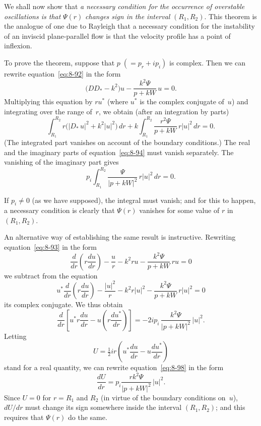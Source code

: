 We shall now show that \emph{a necessary condition for the occurrence of overstable oscillations is that} $\Psi(r)$ \emph{changes sign in the interval} $(R_1, R_2)$. This theorem is the analogue of one due to Rayleigh that a necessary condition for the instability of an inviscid plane-parallel flow is that the velocity profile has a point of inflexion.

To prove the theorem, suppose that $p\;(= p_r + ip_i)$ is complex. Then we can rewrite equation~\eqref{eq:8-92} in the form
\begin{equation}
\label{eq:8-93}
\bigl(DD_* - k^2\bigr)u - \frac{k^2\Psi}{p+kW}\,u = 0.
\end{equation}
Multiplying this equation by $ru^*$ (where $u^*$ is the complex conjugate of~$u$) and integrating over the range of~$r$, we obtain (after an integration by parts)
\begin{equation}
\label{eq:8-94}
\int_{R_1}^{R_2} r\bigl(|D_*\,u|^2 + k^2|u|^2\bigr)\,dr + k\int_{R_1}^{R_2} \frac{r^2\Psi}{p+kW}\,r|u|^2\,dr = 0.
\end{equation}
(The integrated part vanishes on account of the boundary conditions.) The real and the imaginary parts of equation~\eqref{eq:8-94} must vanish separately. The vanishing of the imaginary part gives
\begin{equation}
\label{eq:8-95}
p_i\int_{R_1}^{R_2} \frac{\Psi}{|p+kW|^2}\,r|u|^2\,dr = 0.
\end{equation}

If $p_i \neq 0$ (as we have supposed), the integral must vanish; and for this to happen, a necessary condition is clearly that $\Psi(r)$ vanishes for some value of $r$ in $(R_1, R_2)$.

An alternative way of establishing the same result is instructive. Rewriting equation~\eqref{eq:8-93} in the form
\begin{equation}
\label{eq:8-96}
\frac{d}{dr}\!\left(r\frac{du}{dr}\right) - \frac{u}{r} - k^2 r u - \frac{k^2\Psi}{p+kW}\,ru = 0
\end{equation}
we subtract from the equation
\begin{equation}
\label{eq:8-97}
u^*\frac{d}{dr}\!\left(r\frac{du}{dr}\right) - \frac{|u|^2}{r} - k^2 r|u|^2 - \frac{k^2\Psi}{p+kW}\,r|u|^2 = 0
\end{equation}
its complex conjugate. We thus obtain
\begin{equation}
\label{eq:8-98}
\frac{d}{dr}\!\left[u^*r\frac{du}{dr} - u\!\left(r\frac{du^*}{dr}\right)\right] = -2ip_i\,\frac{k^2\Psi}{|p+kW|^2}\,|u|^2.
\end{equation}
Letting
\begin{equation}
\label{eq:8-99}
U = \tfrac{1}{2}ir\!\left(u^*\frac{du}{dr} - u\frac{du^*}{dr}\right)
\end{equation}
stand for a real quantity, we can rewrite equation~\eqref{eq:8-98} in the form
\begin{equation}
\label{eq:8-100}
\frac{dU}{dr} = p_i\frac{rk^2\Psi}{|p+kW|^2}\,|u|^2.
\end{equation}
Since $U = 0$ for $r = R_1$ and $R_2$ (in virtue of the boundary conditions on~$u$), $dU/dr$ must change its sign somewhere inside the interval $(R_1, R_2)$; and this requires that $\Psi(r)$ do the same.

